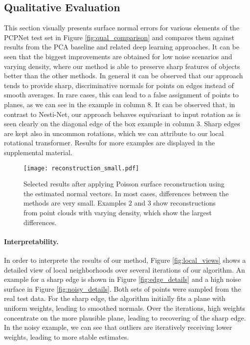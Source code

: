 \documentclass[10pt,twocolumn,letterpaper]{article}
\begin{document}
\subsection{Qualitative Evaluation}
\label{sec:qualitative}
This section visually presents surface normal errors for various elements of the PCPNet test set in Figure \ref{fig:qual_comparison} and compares them against results from the PCA baseline and related deep learning approaches. It can be seen that the biggest improvements are obtained for low noise scenarios and varying density, where our method is able to preserve sharp features of objects better than the other methods. In general it can be observed that our approach tends to provide sharp, discriminative normals for points on edges instead of smooth averages. In rare cases, this can lead to a false assignment of points to planes, as we can see in the example in column 8. It can be observed  that, in contrast to Nesti-Net, our approach behaves equivariant to input rotation as is seen clearly on the diagonal edge of the box example in column 3. Sharp edges are kept also in uncommon rotations, which we can attribute to our local rotational transformer. Results for more examples are displayed in the supplemental material.

 \begin{figure}[h]
\centering
  \texttt{[image: reconstruction\_small.pdf]}
  \caption{Selected results after applying Poisson surface reconstruction using the estimated normal vectors. In most cases, differences between the methods are very small. Examples 2 and 3 show reconstructions from point clouds with varying density, which show the largest differences.}
  \label{fig:reconstruction}
\end{figure}


\paragraph{Interpretability.}
In order to interprete the results of our method, Figure \ref{fig:local_views} shows a detailed view of local neighborhoods over several iterations of our algorithm. An example for a sharp edge is shown in Figure \ref{fig:edge_details} and a high noise surface in Figure \ref{fig:noisy_details}. Both sets of points were sampled from the real test data. For the sharp edge, the algorithm initially fits a plane with uniform weights, leading to smoothed normals. Over the iterations, high weights concentrate on the more plausible plane, leading to recovering of the sharp edge. In the noisy example, we can see that outliers are iteratively receiving lower weights, leading to more stable estimates.
\end{document}
